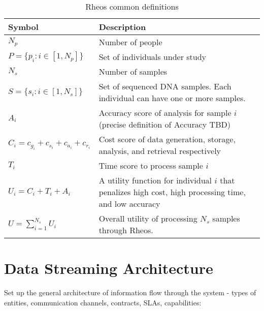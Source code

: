 \begin{table}[!ht]
    \caption{Rheos common definitions}
    \label{tab:rheos_notation}
    {\begin{tabular}{lp{7cm}}
    \toprule
    Symbol & Description \\
    \midrule
    $N_p$ & Number of people \\
    $P = \{p_i : i \in [1,N_p]\}$ & Set of individuals under study \\
    $N_s$ & Number of samples \\
    $S = \{s_i : i \in [1,N_s]\}$ & Set of sequenced DNA samples. Each individual can have one or more samples. \\
    $A_i $ & Accuracy score of analysis for sample $i$ (precise definition of Accuracy TBD) \\
    $C_i = c_{g_i} + c_{s_i} + c_{a_i} + c_{r_i}$ & Cost score of data generation, storage, analysis, and retrieval respectively \\
    $T_i$ & Time score to process sample $i$ \\
    $U_i = C_i + T_i + A_i$ & A utility function for individual $i$ that penalizes high cost, high processing time, and low accuracy\\
    $U = \sum_{i=1}^{N_s} U_i$ & Overall utility of processing $N_s$ samples through Rheos.\\
    \bottomrule
    \end{tabular}}
\end{table}


\section{Data Streaming Architecture}

Set up the general architecture of information flow through the system - types of entities, communication channels, contracts, SLAs, capabilities:

